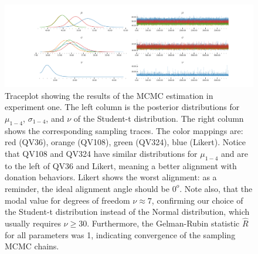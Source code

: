 \begin{figure}
  \centering
  \includegraphics[trim= 2in 0in 2in 0in, clip, width=\textwidth, keepaspectratio=true]{content/image/StudentTIndep_VA_traceplot.pdf}
  \caption{
    Traceplot showing the results of the MCMC estimation in experiment one. The left column is the posterior distributions for $\mu_{1-4}$, $\sigma_{1-4}$, and $\nu$ of the Student-t distribution. The right column shows the corresponding sampling traces. The color mappings are: red (QV36), orange (QV108), green (QV324), blue (Likert). Notice that QV108 and QV324 have similar distributions for $\mu_{1-4}$ and are to the left of QV36 and Likert, meaning a better alignment with donation behaviors. Likert shows the worst alignment: as a reminder, the ideal alignment angle should be $0^o$. Note also, that the modal value for degrees of freedom $\nu \approx 7$, confirming our choice of the Student-t distribution instead of the Normal distribution, which usually requires $\nu \geq 30$. Furthermore, the Gelman-Rubin statistic $\hat{R}$ for all parameters was 1, indicating  convergence of the sampling MCMC chains.
  }
  \label{fig:traceplot_exp1}
\end{figure}



